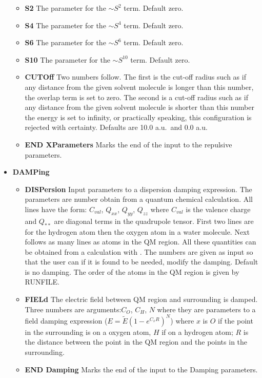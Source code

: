\begin{keywordlist}
\begin{itemize}
\begin{itemize}
\item {\bf S2}
The parameter for the $\sim S^2$ term. Default zero.
\item {\bf S4}
The parameter for the $\sim S^4$ term. Default zero.
\item {\bf S6}
The parameter for the $\sim S^6$ term. Default zero.
\item {\bf S10}
The parameter for the $\sim S^10$ term. Default zero.
\item {\bf CUTOff}
Two numbers follow. The first is the cut-off radius such as if
any distance from the given solvent molecule is longer than
this number, the overlap term is set to zero. The second
is a cut-off radius such as if any distance from the given
solvent molecule is shorter than this number the energy is
set to infinity, or practically speaking, this configuration is
rejected with certainty. Defaults are 10.0 a.u.~and 0.0 a.u.
\item {\bf END XParameters} Marks the end of the input to the repulsive parameters.
\end{itemize}
\item {\bf DAMPing}
\begin{itemize}
\item {\bf DISPersion}
Input parameters to a dispersion damping expression. The parameters
are number obtain from a quantum chemical calculation. All lines
have the form: $C_{val}$, $Q_{xx}$, $Q_{yy}$, $Q_{zz}$ where
$C_{val}$ is the valence charge and $Q_{**}$ are diagonal terms
in the quadrupole tensor. First two lines are for the hydrogen
atom then the oxygen atom in a water molecule. Next follows as
many lines as atoms in the QM region. All these quantities
can be obtained from a calculation with .
The numbers are given as input so that the user can if it is found
to be needed, modify the damping. Default is no damping.
The order of the atoms in the QM region is given by RUNFILE.
\item {\bf FIELd}
The electric field between QM region and surrounding is damped.
Three numbers are arguments:$C_O$, $C_H$, $N$ where they are
parameters to a field damping expression
($E=\tilde{E}(1-e^{C_x R})^N$) where $x$ is $O$ if the point
in the surrounding is on a oxygen atom, $H$ if on a hydrogen
atom; $R$ is the distance between the point in the QM region
and the points in the surrounding.
\item {\bf END Damping}
Marks the end of the input to the Damping parameters.
\end{itemize}

\end{itemize}
\end{keywordlist}
